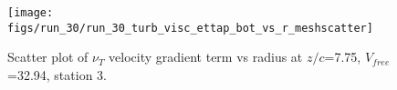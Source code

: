 \begin{figure}[H]
\centering
\texttt{[image: figs/run\_30/run\_30\_turb\_visc\_ettap\_bot\_vs\_r\_meshscatter]}
\caption{Scatter plot of $\nu_T$ velocity gradient term vs radius at $z/c$=7.75, $V_{free}$=32.94, station 3.}
\label{fig:run_30_turb_visc_ettap_bot_vs_r_meshscatter}
\end{figure}


